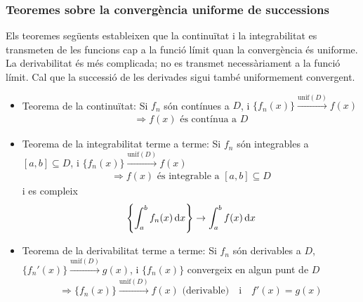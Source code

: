 \subsubsection*{Teoremes sobre la convergència uniforme de successions}
Els teoremes següents estableixen que la continuïtat i la integrabilitat es transmeten de les funcions cap a la funció límit quan la convergència és uniforme. La derivabilitat és més complicada; no es transmet necessàriament a la funció límit. Cal que la successió de les derivades sigui també uniformement convergent.
\begin{itemize}
    \item Teorema de la continuïtat:
        \subitem Si $f_{n}$ són contínues a $D$, i $\{ f_{n} (x) \} \overset{\text{unif}(D)}{\longrightarrow} f(x)$
        \begin{align}
            \Rightarrow f(x) \text{ és contínua a } D
        \end{align}
    \item Teorema de la integrabilitat terme a terme:
        \subitem Si $f_{n}$ són integrables a $[a, b] \subseteq D$, i $\{ f_{n} (x) \} \overset{\text{unif}(D)}{\longrightarrow} f(x)$
        \begin{align}
            \Rightarrow f(x) \text{ és integrable a } [a, b] \subseteq D
        \end{align}
        \subitem i es compleix
        \begin{align}
            \left\{ \int_{a}^{b} f_{n} (x) \mathop{}\!\mathrm{d} x \right\} \to \int_{a}^{b} f (x) \mathop{}\!\mathrm{d} x
        \end{align}
    \item Teorema de la derivabilitat terme a terme:
        \subitem Si $f_{n}$ són derivables a $D$, $\{ f_{n}' (x) \} \overset{\text{unif}(D)}{\longrightarrow} g(x)$, i $\{ f_{n} (x) \}$ convergeix en algun punt de $D$
        \begin{align}
            \Rightarrow \{ f_{n} (x) \} \overset{\text{unif}(D)}{\longrightarrow} f(x) \text{ (derivable)} \quad \text{i} \quad f'(x) = g(x)
        \end{align}
\end{itemize}


